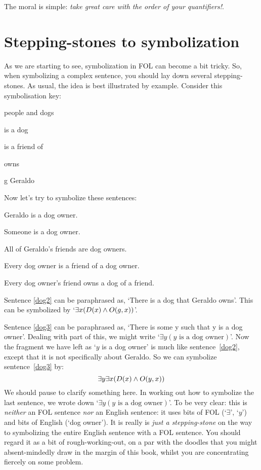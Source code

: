 The moral is simple: \emph{take great care with the order of your quantifiers!}.


\section{Stepping-stones to symbolization}
As we are starting to see, symbolization in FOL can become a bit tricky. So, when symbolizing a complex sentence, you should lay down several stepping-stones. As usual, the idea is best illustrated by example. Consider this symbolisation key: 
\begin{ekey}
\item[\text{domain}] people and dogs
\item[\atom{D}{x}]  is a dog
\item[\atom{F}{x,y}]  is a friend of 
\item[\atom{O}{x,y}]  owns 
\item[g] Geraldo
\end{ekey}
Now let's try to symbolize these sentences:
\begin{earg}
\item[\ex{dog2}] Geraldo is a dog owner.
\item[\ex{dog3}] Someone is a dog owner.
\item[\ex{dog4}] All of Geraldo's friends are dog owners.
\item[\ex{dog5}] Every dog owner is a friend of a dog owner.
\item[\ex{dog6}] Every dog owner's friend owns a dog of a friend.
\end{earg}
Sentence \ref{dog2} can be paraphrased as, `There is a dog that Geraldo owns'. This can be symbolized by `$\exists x(\mathord{D}(x) \wedge \mathord{O}(g,x))$'.

Sentence \ref{dog3} can be paraphrased as, `There is some y such that y is a dog owner'. Dealing with part of this, we might write `$\exists y(y\text{ is a dog owner})$'. Now the fragment we have left as `$y$ is a dog owner' is much like sentence~\ref{dog2}, except that it is not specifically about Geraldo. So we can symbolize sentence~\ref{dog3} by:
$$\exists y \exists x(\mathord{D}(x) \wedge \mathord{O}(y,x))$$
We should pause to clarify something here. In working out how to symbolize the last sentence, we wrote down `$\exists y(y\text{ is a dog owner})$'. To be very clear: this is \emph{neither} an FOL sentence \emph{nor} an English sentence: it uses bits of FOL (`$\exists$', `$y$') and bits of English (`dog owner'). It is really is \emph{just a stepping-stone} on the way to symbolizing the entire English sentence with a FOL sentence. You should regard it as a bit of rough-working-out, on a par with the doodles that you might absent-mindedly draw in the margin of this book, whilst you are concentrating fiercely on some problem.  

